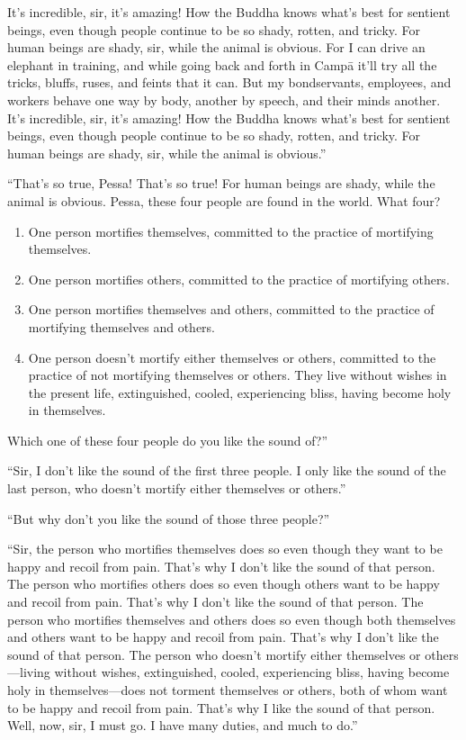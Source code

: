\documentclass[12pt,openany]{book}%
\begin{document}
It’s incredible, sir, it’s amazing! How the Buddha knows what’s best for sentient beings, even though people continue to be so shady, rotten, and tricky. For human beings are shady, sir, while the animal is obvious. For I can drive an elephant in training, and while going back and forth in \textsanskrit{Campā} it’ll try all the tricks, bluffs, ruses, and feints that it can. But my bondservants, employees, and workers behave one way by body, another by speech, and their minds another. It’s incredible, sir, it’s amazing! How the Buddha knows what’s best for sentient beings, even though people continue to be so shady, rotten, and tricky. For human beings are shady, sir, while the animal is obvious.” 

“That’s so true, Pessa! That’s so true! For human beings are shady, while the animal is obvious. Pessa, these four people are found in the world. What four? 

\begin{enumerate}%
\item One person mortifies themselves, committed to the practice of mortifying themselves. %
\item One person mortifies others, committed to the practice of mortifying others. %
\item One person mortifies themselves and others, committed to the practice of mortifying themselves and others. %
\item One person doesn’t mortify either themselves or others, committed to the practice of not mortifying themselves or others. They live without wishes in the present life, extinguished, cooled, experiencing bliss, having become holy in themselves. %
\end{enumerate}

Which one of these four people do you like the sound of?” 

“Sir, I don’t like the sound of the first three people. I only like the sound of the last person, who doesn’t mortify either themselves or others.” 

“But why don’t you like the sound of those three people?” 

“Sir, the person who mortifies themselves does so even though they want to be happy and recoil from pain. That’s why I don’t like the sound of that person. The person who mortifies others does so even though others want to be happy and recoil from pain. That’s why I don’t like the sound of that person. The person who mortifies themselves and others does so even though both themselves and others want to be happy and recoil from pain. That’s why I don’t like the sound of that person. The person who doesn’t mortify either themselves or others—living without wishes, extinguished, cooled, experiencing bliss, having become holy in themselves—does not torment themselves or others, both of whom want to be happy and recoil from pain. That’s why I like the sound of that person. Well, now, sir, I must go. I have many duties, and much to do.” 
\end{document}

